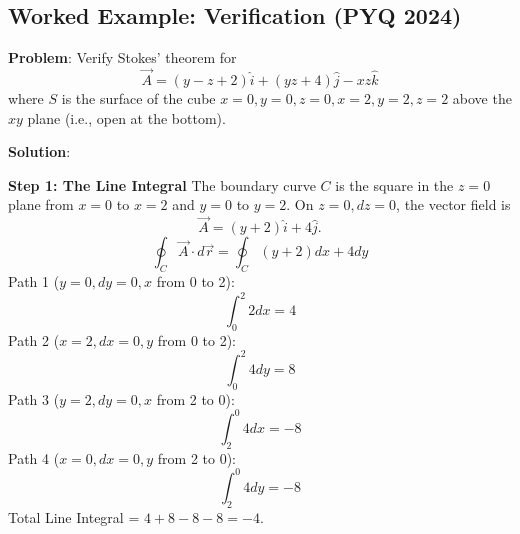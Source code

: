 \documentclass[
]{article}
\begin{document}
\subsection{Worked Example: Verification (PYQ
2024)}\label{worked-example-verification-pyq-2024}

\textbf{Problem}: Verify Stokes' theorem for
\[
\vec{A} = (y - z + 2)\hat{i} + (yz + 4)\hat{j} - xz\hat{k}
\]
where \(S\) is the surface of the cube \(x=0, y=0, z=0, x=2, y=2, z=2\)
above the \(xy\) plane (i.e., open at the bottom).

\textbf{Solution}:

\textbf{Step 1: The Line Integral} The boundary curve \(C\) is the
square in the \(z=0\) plane from \(x=0\) to \(x=2\) and \(y=0\) to
\(y=2\). On \(z=0, dz=0\), the vector field is
\[
\vec{A} = (y + 2)\hat{i} + 4\hat{j}.
\]
\[
\oint_C \vec{A} \cdot d\vec{r} = \oint_C (y + 2) dx + 4 dy
\]
Path 1 (\(y=0, dy=0, x\) from 0 to 2):
\[
\int_0^2 2 dx = 4
\]
Path 2 (\(x=2, dx=0, y\) from 0 to 2):
\[
\int_0^2 4 dy = 8
\]
Path 3 (\(y=2, dy=0, x\) from 2 to 0):
\[
\int_2^0 4 dx = -8
\]
Path 4 (\(x=0, dx=0, y\) from 2 to 0):
\[
\int_2^0 4 dy = -8
\]
Total Line Integral = \(4 + 8 - 8 - 8 = -4\).
\end{document}
